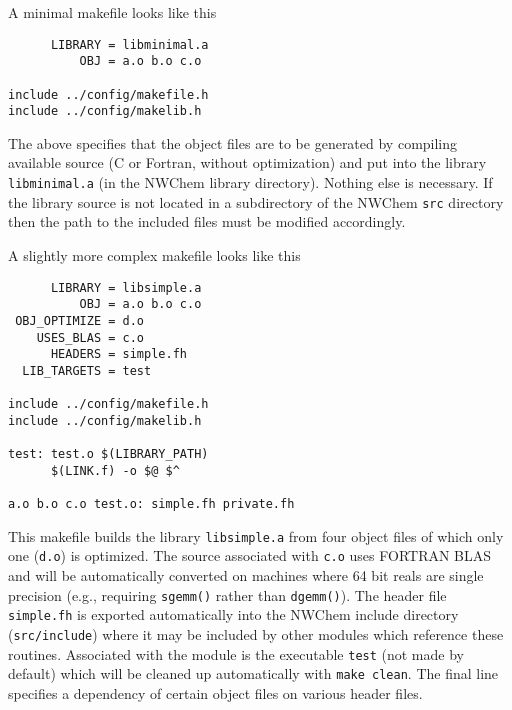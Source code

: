 A minimal makefile looks like this
\begin{verbatim}
      LIBRARY = libminimal.a
          OBJ = a.o b.o c.o

include ../config/makefile.h
include ../config/makelib.h
\end{verbatim}

The above specifies that the object files are to be generated by
compiling available source (C or Fortran, without optimization) and
put into the library {\tt libminimal.a} (in the NWChem library
directory).  Nothing else is necessary.  If the library source is not
located in a subdirectory of the NWChem {\tt src} directory then the
path to the included files must be modified accordingly.

A slightly more complex makefile looks like this
\begin{verbatim}
      LIBRARY = libsimple.a
          OBJ = a.o b.o c.o
 OBJ_OPTIMIZE = d.o
    USES_BLAS = c.o
      HEADERS = simple.fh
  LIB_TARGETS = test

include ../config/makefile.h
include ../config/makelib.h

test: test.o $(LIBRARY_PATH)
      $(LINK.f) -o $@ $^

a.o b.o c.o test.o: simple.fh private.fh
\end{verbatim}

This makefile builds the library {\tt libsimple.a} from four object
files of which only one ({\tt d.o}) is optimized.  The source
associated with {\tt c.o} uses FORTRAN BLAS and will be automatically
converted on machines where 64 bit reals are single precision (e.g.,
requiring {\tt sgemm()} rather than {\tt dgemm()}).  The header file
{\tt simple.fh} is exported automatically into the NWChem include
directory ({\tt src/include}) where it may be included by other
modules which reference these routines.  Associated with the module is
the executable {\tt test} (not made by default) which will be cleaned
up automatically with \verb+make clean+.  The final line
specifies a dependency of certain object files on various header
files.


